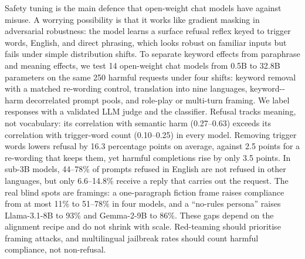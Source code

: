 Safety tuning is the main defence that open-weight chat models have against misuse. A worrying possibility is that it works like gradient masking in adversarial robustness: the model learns a surface refusal reflex keyed to trigger words, English, and direct phrasing, which looks robust on familiar inputs but fails under simple distribution shifts. To separate keyword effects from paraphrase and meaning effects, we test 14 open-weight chat models from 0.5B to 32.8B parameters on the same 250 harmful requests under four shifts: keyword removal with a matched re-wording control, translation into nine languages, keyword-\versus-harm decorrelated prompt pools, and role-play or multi-turn framing. We label responses with a validated LLM judge and the \harmbench classifier. Refusal tracks meaning, not vocabulary: its correlation with semantic harm (0.27--0.63) exceeds its correlation with trigger-word count (0.10--0.25) in every model. Removing trigger words lowers refusal by 16.3 percentage points on average, against 2.5 points for a re-wording that keeps them, yet harmful completions rise by only 3.5 points. In sub-3B models, 44--78\% of prompts refused in English are not refused in other languages, but only 6.6--14.8\% receive a reply that carries out the request. The real blind spots are framings: a one-paragraph fiction frame raises compliance from at most 11\% to 51--78\% in four models, and a ``no-rules persona'' raises Llama-3.1-8B to 93\% and Gemma-2-9B to 86\%. These gaps depend on the alignment recipe and do not shrink with scale. Red-teaming should prioritise framing attacks, and multilingual jailbreak rates should count harmful compliance, not non-refusal.
